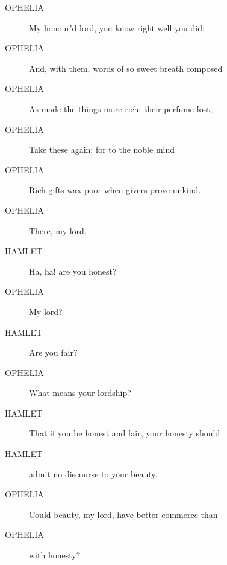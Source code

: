 \documentclass{article}
\begin{document}
\begin{description}
            
\item[OPHELIA] My honour'd lord, you know right well you did;
\item[OPHELIA] And, with them, words of so sweet breath composed
\item[OPHELIA] As made the things more rich: their perfume lost,
\item[OPHELIA] Take these again; for to the noble mind
\item[OPHELIA] Rich gifts wax poor when givers prove unkind.
\item[OPHELIA] There, my lord.
\end{description}
          
\begin{description}
            
\item[HAMLET] Ha, ha! are you honest?
\end{description}
          
\begin{description}
            
\item[OPHELIA] My lord?
\end{description}
          
\begin{description}
            
\item[HAMLET] Are you fair?
\end{description}
          
\begin{description}
            
\item[OPHELIA] What means your lordship?
\end{description}
          
\begin{description}
            
\item[HAMLET] That if you be honest and fair, your honesty should
\item[HAMLET] admit no discourse to your beauty.
\end{description}
          
\begin{description}
            
\item[OPHELIA] Could beauty, my lord, have better commerce than
\item[OPHELIA] with honesty?
\end{description}
          
\end{document}
